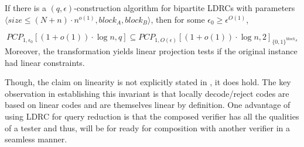 \begin{theorem} \label{query}
If there is a $(q, \epsilon)$-construction algorithm for bipartite
LDRCs with parameters $\langle size \le (N + n) \cdot n^{o(1)},
block_A, block_B \rangle$, then for some $\epsilon_0 \ge \epsilon^{O(1)}$,

\[
PCP_{1, \epsilon_0}\left[\left(1 + o\left(1\right)\right) \cdot \log
  n, q\right] \subseteq PCP_{1,O(\epsilon)}\left[\left(1 +
  o\left(1\right)\right) \cdot \log n, 2\right]_{\{0,1\}^{block_A}}
\]
Moreover, the transformation yields linear projection tests if the
original instance had linear constraints.
\end{theorem}

Though, the claim on linearity is not explicitly stated in
\cite{MR08}, it does hold. The key observation in establishing this
invariant is that locally decode/reject codes are based on linear
codes and are themselves linear by definition. One advantage of using
LDRC for query reduction is that the composed verifier has all the
qualities of a tester and thus, will be for ready for composition with
another verifier in a seamless manner.




